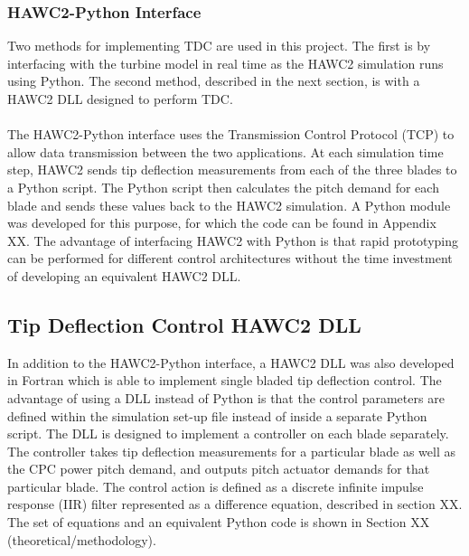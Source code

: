 \subsubsection{HAWC2-Python Interface}
Two methods for implementing TDC are used in this project. The first is by interfacing with the turbine model in real time as the HAWC2 simulation runs using Python. The second method, described in the next section, is with a HAWC2 DLL designed to perform TDC.
\\~\\
The HAWC2-Python interface uses the Transmission Control Protocol (TCP) to allow data transmission between the two applications. At each simulation time step, HAWC2 sends tip deflection measurements from each of the three blades to a Python script. The Python script then calculates the pitch demand for each blade and sends these values back to the HAWC2 simulation. A Python module was developed for this purpose, for which the code can be found in Appendix XX. The advantage of interfacing HAWC2 with Python is that rapid prototyping can be performed for different control architectures without the time investment of developing an equivalent HAWC2 DLL.

\subsection{Tip Deflection Control HAWC2 DLL}
In addition to the HAWC2-Python interface, a HAWC2 DLL was also developed in Fortran which is able to implement single bladed tip deflection control. The advantage of using a DLL instead of Python is that the control parameters are defined within the simulation set-up file instead of inside a separate Python script. The DLL is designed to implement a controller on each blade separately. The controller takes tip deflection measurements for a particular blade as well as the CPC power pitch demand, and outputs pitch actuator demands for that particular blade. The control action is defined as a discrete infinite impulse response (IIR) filter represented as a difference equation, described in section XX. The set of equations and an equivalent Python code is shown in Section XX (theoretical/methodology).

